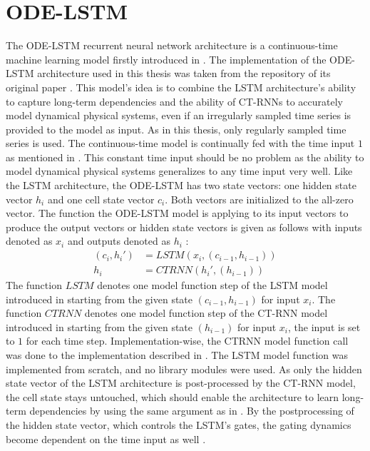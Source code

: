 \documentclass[draft,final]{vutinfth} %
\begin{document}
    \section{ODE-LSTM} \label{odelstm}
    The ODE-LSTM recurrent neural network architecture is a continuous-time machine learning model firstly introduced in \cite{ODELSTM}.
    The implementation of the ODE-LSTM architecture used in this thesis was taken from the repository of its original paper \cite{ODELSTM}.
    This model's idea is to combine the LSTM architecture's ability to capture long-term dependencies and the ability of CT-RNNs to accurately model dynamical physical systems, even if an irregularly sampled time series is provided to the model as input.
    As in this thesis, only regularly sampled time series is used. The continuous-time model is continually fed with the time input $1$ as mentioned in .
    This constant time input should be no problem as the ability to model dynamical physical systems generalizes to any time input very well.
    Like the LSTM architecture, the ODE-LSTM has two state vectors: one hidden state vector $h_i$ and one cell state vector $c_i$. Both vectors are initialized to the all-zero vector.
    The function the ODE-LSTM model is applying to its input vectors to produce the output vectors or hidden state vectors is given as follows with inputs denoted as $x_i$ and outputs denoted as $h_i$ \cite[p. 5]{ODELSTM}:
    \begin{align}
    (c_i,h_i')
        &= LSTM(x_i, (c_{i-1}, h_{i-1})) \\
        h_i &= CTRNN(h_i', (h_{i-1}))
    \end{align}
    The function $LSTM$ denotes one model function step of the LSTM model introduced in  starting from the given state $(c_{i-1}, h_{i-1})$ for input $x_i$.
    The function $CTRNN$ denotes one model function step of the CT-RNN model introduced in  starting from the given state $(h_{i-1})$ for input $x_i$, the input is set to $1$ for each time step.
    Implementation-wise, the CTRNN model function call was done to the implementation described in .
    The LSTM model function was implemented from scratch, and no library modules were used.
    As only the hidden state vector of the LSTM architecture is post-processed by the CT-RNN model, the cell state stays untouched, which should enable the architecture to learn long-term dependencies by using the same argument as in .
    By the postprocessing of the hidden state vector, which controls the LSTM's gates, the gating dynamics become dependent on the time input as well \cite[p. 4]{ODELSTM}.
\end{document}
